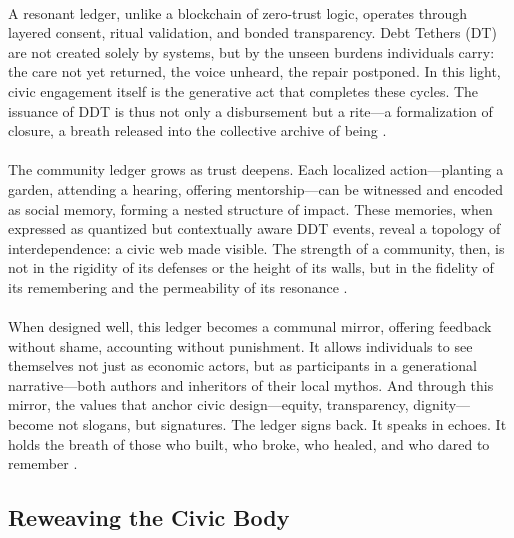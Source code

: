 \documentclass[12pt]{article}
\begin{document}
\paragraph{}A resonant ledger, unlike a blockchain of zero-trust logic, operates through layered consent, ritual validation, and bonded transparency. Debt Tethers (DT) are not created solely by systems, but by the unseen burdens individuals carry: the care not yet returned, the voice unheard, the repair postponed. In this light, civic engagement itself is the generative act that completes these cycles. The issuance of DDT is thus not only a disbursement but a rite—a formalization of closure, a breath released into the collective archive of being \cite{hooks1994teaching,levinas1969totality}.

\paragraph{}The community ledger grows as trust deepens. Each localized action—planting a garden, attending a hearing, offering mentorship—can be witnessed and encoded as social memory, forming a nested structure of impact. These memories, when expressed as quantized but contextually aware DDT events, reveal a topology of interdependence: a civic web made visible. The strength of a community, then, is not in the rigidity of its defenses or the height of its walls, but in the fidelity of its remembering and the permeability of its resonance \cite{brown2022architecture,decmic2022reclaiming}.

\paragraph{}When designed well, this ledger becomes a communal mirror, offering feedback without shame, accounting without punishment. It allows individuals to see themselves not just as economic actors, but as participants in a generational narrative—both authors and inheritors of their local mythos. And through this mirror, the values that anchor civic design—equity, transparency, dignity—become not slogans, but signatures. The ledger signs back. It speaks in echoes. It holds the breath of those who built, who broke, who healed, and who dared to remember \cite{weiner1992inalienable}.

\subsection{Reweaving the Civic Body}
\end{document}

